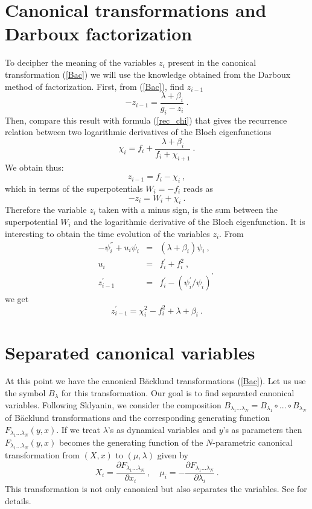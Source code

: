 \documentclass[a4paper,11pt]{article}
\begin{document}
\section{Canonical transformations and Darboux factorization}
To decipher the meaning of the variables $z_i$ present in the canonical
transformation (\ref{Bac}) we will use the knowledge obtained from the
Darboux method of factorization. First, from (\ref{Bac}), find $z_{i-1}$
\begin{equation}
-z_{i-1}=\frac{\lambda +\beta _i}{g_i-z_i} ~.
\end{equation}
Then, compare this result with formula (\ref{rec_chi}) that gives the
recurrence relation between two logarithmic derivatives of the Bloch
eigenfunctions
\begin{equation}
\chi _i=f_i+\frac{\lambda +\beta_i}{f_i+\chi _{i+1}} ~.
\end{equation}
We obtain thus:
\begin{equation}
\label{chi}
z_{i-1}=f_i-\chi_i ~,
\end{equation}
which in terms of the superpotentials $W_i = -f_i$ reads as
$$
-z_i = W_i + \chi_i ~.
$$
Therefore the variable $z_i$ taken with a minus sign, is the sum between the
superpotential $W_i$ and the logarithmic derivative of the Bloch
eigenfunction. It is interesting to obtain the time evolution of the
variables $z_i$. From
\begin{eqnarray}
\label{timez}
-\psi_i^{''}+u_i\psi_i&=&(\lambda+\beta_i)\psi_i ~,\\
u_i&=&f_i^{'}+f_i^2 ~,\\
z_{i-1}^{'}&=&f_i^{'}-(\psi_i^{'}/\psi_i)^{'} ~
\end{eqnarray}
 we get
\begin{equation}
\label{evolz}
z_{i-1}^{'}=\chi_i^2-f_i^2+\lambda+\beta_i ~.
\end{equation}

\section{Separated canonical variables}
At this point we have the canonical B\"acklund transformations (\ref{Bac}).
Let us use the symbol $B_{\lambda}$ for this transformation. Our goal is to
find separated canonical variables. Following Sklyanin, we consider the
composition $B_{\lambda_1...\lambda_N}=B_{\lambda_1}\circ...\circ
B_{\lambda_N}$ of B\"acklund transformations and the corresponding
generating function $F_{\lambda _1...\lambda _N}(y,x).$ If we treat $\lambda
$'s as dynamical variables and $y$'s as parameters then
$F_{\lambda_1...\lambda_N}(y,x)$ becomes the generating function of the
$N$-parametric canonical transformation from $(X,x)$ to $(\mu,\lambda)$
given by
\begin{equation}
\label{cans}
X_i=\frac{\partial F_{\lambda_1...\lambda_N}}{\partial x_i} ~,\quad
\mu_i=-\frac{\partial F_{\lambda_1...\lambda_N}}{\partial \lambda_i} ~.
\end{equation}
This transformation is not only canonical but also separates the variables.
See \cite{Kuz} for details.
\end{document}
